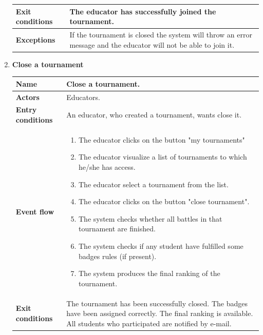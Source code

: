 \begin{enumerate}[label=\textbf{UC.\arabic*}]
\begin{table}[H]
\begin{tabular}{|m{3.2cm}|m{9.8cm}|}
                    \textbf{Exit conditions}  & The educator has successfully joined the tournament. \\
                    \hline
                    \textbf{Exceptions}  & If the tournament is closed the system will throw an error message and the educator will not be able to join it. \\
                    \hline 
                \end{tabular}
        \end{table}
        \item {} \textbf{Close a tournament}
        \begin{table}[H]
    	    \centering
                \renewcommand{\arraystretch}{1.5}
                \begin{tabular}{|m{3.2cm}|m{9.8cm}|}
                    \hline
                    \textbf{Name} & Close a tournament. \\
                    \hline
                    \textbf{Actors} & Educators. \\
                    \hline
                    \textbf{Entry conditions}  &  An educator, who created a tournament, wants close it. \\
                    \hline
                    \textbf{Event flow}  & 
                    \begin{enumerate}[label=\arabic*.]
                        \item The educator clicks on the button "my tournaments"
                        \item The educator visualize a list of tournaments to which he/she has access.
                        \item The educator select a tournament from the list.
                        \item The educator clicks on the button "close tournament".
                        \item The system checks whether all battles in that tournament are finished.
                        \item The system checks if any student have fulfilled some badges rules (if present).
                        \item The system produces the final ranking of the tournament.
                    \end{enumerate}\\
                    \hline
                    \textbf{Exit conditions}  & The tournament has been successfully closed. The badges have been assigned correctly. The final ranking is available. All students who participated are notified by e-mail. \\

\end{tabular}
\end{table}
\end{enumerate}
